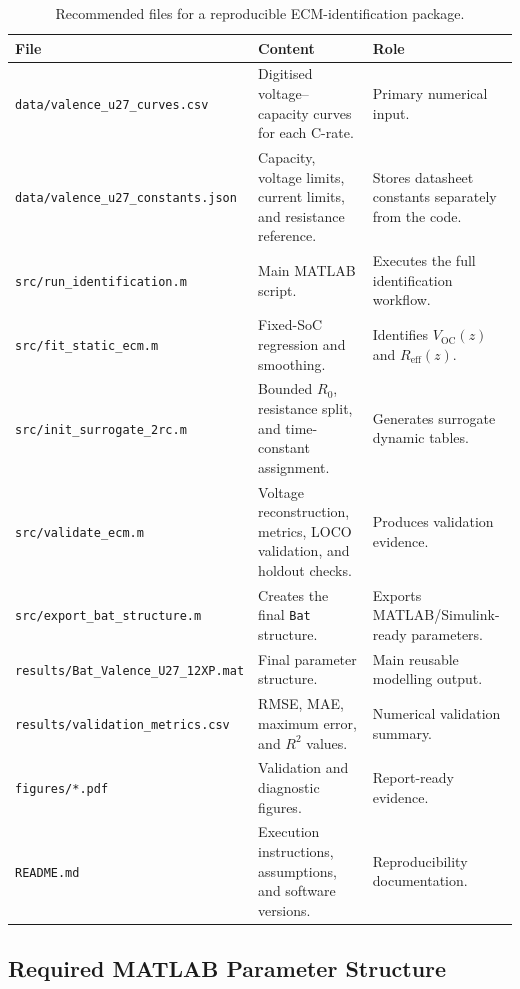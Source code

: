 \documentclass[a4paper,12pt]{article}
\begin{document}
\begin{table}[H]
\centering
\caption{Recommended files for a reproducible ECM-identification package.}
\label{tab:recommended_package_files}
\begin{tabularx}{0.98\textwidth}{@{}L{0.32\textwidth}Y Y@{}}
\toprule
\textbf{File} &
\textbf{Content} &
\textbf{Role} \\
\midrule
\texttt{data/valence\_u27\_curves.csv} &
Digitised voltage--capacity curves for each C-rate. &
Primary numerical input. \\
\texttt{data/valence\_u27\_constants.json} &
Capacity, voltage limits, current limits, and resistance reference. &
Stores datasheet constants separately from the code. \\
\texttt{src/run\_identification.m} &
Main MATLAB script. &
Executes the full identification workflow. \\
\texttt{src/fit\_static\_ecm.m} &
Fixed-SoC regression and smoothing. &
Identifies \(V_{\mathrm{OC}}(z)\) and \(R_{\mathrm{eff}}(z)\). \\
\texttt{src/init\_surrogate\_2rc.m} &
Bounded \(R_0\), resistance split, and time-constant assignment. &
Generates surrogate dynamic tables. \\
\texttt{src/validate\_ecm.m} &
Voltage reconstruction, metrics, LOCO validation, and holdout checks. &
Produces validation evidence. \\
\texttt{src/export\_bat\_structure.m} &
Creates the final \texttt{Bat} structure. &
Exports MATLAB/Simulink-ready parameters. \\
\texttt{results/Bat\_Valence\_U27\_12XP.mat} &
Final parameter structure. &
Main reusable modelling output. \\
\texttt{results/validation\_metrics.csv} &
RMSE, MAE, maximum error, and \(R^2\) values. &
Numerical validation summary. \\
\texttt{figures/*.pdf} &
Validation and diagnostic figures. &
Report-ready evidence. \\
\texttt{README.md} &
Execution instructions, assumptions, and software versions. &
Reproducibility documentation. \\
\bottomrule
\end{tabularx}
\end{table}

\subsection{Required MATLAB Parameter Structure}
\end{document}
